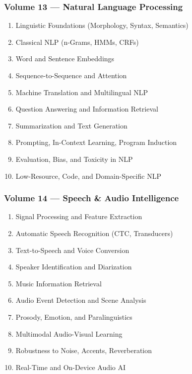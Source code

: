 \documentclass[
  letterpaper,
  DIV=11,
  numbers=noendperiod]{scrreprt}
\providecommand{\tightlist}{%
  \setlength{\itemsep}{0pt}\setlength{\parskip}{0pt}}
\begin{document}
\subsubsection{Volume 13 --- Natural Language
Processing}\label{volume-13-natural-language-processing}

\begin{enumerate}
\def\labelenumi{\arabic{enumi}.}
\setcounter{enumi}{120}
\tightlist
\item
  Linguistic Foundations (Morphology, Syntax, Semantics)
\item
  Classical NLP (n-Grams, HMMs, CRFs)
\item
  Word and Sentence Embeddings
\item
  Sequence-to-Sequence and Attention
\item
  Machine Translation and Multilingual NLP
\item
  Question Answering and Information Retrieval
\item
  Summarization and Text Generation
\item
  Prompting, In-Context Learning, Program Induction
\item
  Evaluation, Bias, and Toxicity in NLP
\item
  Low-Resource, Code, and Domain-Specific NLP
\end{enumerate}

\subsubsection{Volume 14 --- Speech \& Audio
Intelligence}\label{volume-14-speech-audio-intelligence}

\begin{enumerate}
\def\labelenumi{\arabic{enumi}.}
\setcounter{enumi}{130}
\tightlist
\item
  Signal Processing and Feature Extraction
\item
  Automatic Speech Recognition (CTC, Transducers)
\item
  Text-to-Speech and Voice Conversion
\item
  Speaker Identification and Diarization
\item
  Music Information Retrieval
\item
  Audio Event Detection and Scene Analysis
\item
  Prosody, Emotion, and Paralinguistics
\item
  Multimodal Audio-Visual Learning
\item
  Robustness to Noise, Accents, Reverberation
\item
  Real-Time and On-Device Audio AI
\end{enumerate}
\end{document}
